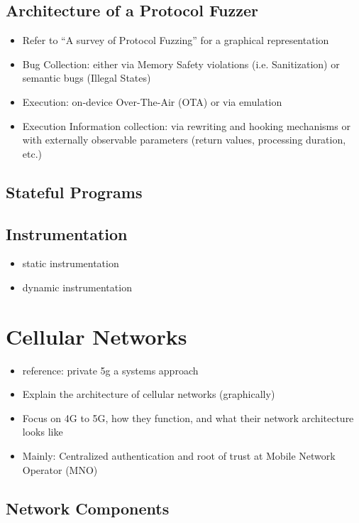 \subsection{Architecture of a Protocol Fuzzer}

\begin{itemize}
  \item Refer to \enquote{A survey of Protocol Fuzzing} for a graphical representation
  \item Bug Collection: either via Memory Safety violations (i.e. Sanitization) or semantic bugs (Illegal States)
  \item Execution: on-device Over-The-Air (OTA) or via emulation
  \item Execution Information collection: via rewriting and hooking mechanisms or with externally observable parameters (return values, processing duration, etc.)
\end{itemize}

\subsection{Stateful Programs}

\subsection{Instrumentation}

\begin{itemize}
  \item static instrumentation 
  \item dynamic instrumentation
\end{itemize}


\section{Cellular Networks}

\begin{itemize}
  \item reference: private 5g a systems approach
  \item Explain the architecture of cellular networks (graphically)
  \item Focus on 4G to 5G, how they function, and what their network architecture looks like
  \item Mainly: Centralized authentication and root of trust at Mobile Network Operator (MNO)
\end{itemize}

\subsection{Network Components}


